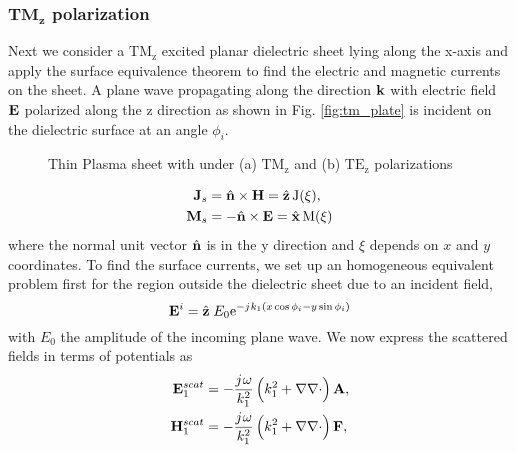 \subsubsection{$\mathbf{TM_z}$ polarization}
%
Next we consider a $\mathrm{TM_z}$ excited planar dielectric sheet lying along the x-axis and apply the surface equivalence theorem to find the electric and magnetic currents on the sheet. A plane wave propagating along the direction $\mathbf{k}$ with electric field $\mathbf{E}$ polarized along the z direction as shown in Fig. \ref{fig:tm_plate} is incident on the dielectric surface at an angle $\phi_i$.
%
\begin{figure}[b!]
  \centering
   \hfil
  \caption{Thin Plasma sheet with under (a) $\mathrm{TM_z}$ and (b) $\mathrm{TE_z}$ polarizations}
  \label{fig:thinsheets}
\end{figure}
%
\begin{subequations}
  \begin{align}
    \mathbf{J}_s &=  \hat{\mathbf{n}} \times \mathbf{H} = \hat {\mathbf{z}} \, \mathrm{J(\xi)},
    \label{eq:J_s}\\
    \mathbf{M}_s &=  -\hat{\mathbf{n}} \times \mathbf{E} = \hat {\mathbf{x}} \, \mathrm{M(\xi)}
    \label{eq:M_s}
  \end{align}
  \label{eq:eq_currents}%
\end{subequations}%
%
where the normal unit vector $\hat{\mathbf{n}}$ is in the y direction and $\xi$ depends on $x$ and $y$ coordinates. To find the surface currents, we set up an homogeneous equivalent problem first for the region outside the dielectric sheet due to an incident field,
%
\begin{equation}
  \mathbf{E}^i = \hat{\mathbf{z}} \; E_0  \mathrm{e}^{-{j}\mkern1mu k_1 (x \cos \phi_i - y \sin \phi_i)}
  \label{eq:E_i}
\end{equation}
%
with $E_0$ the amplitude of the incoming plane wave. We now express the scattered fields in terms of potentials as
%
\begin{subequations}
  \begin{align}
    \mathbf{E}_1^{scat} &=  -\frac{{j}\mkern1mu \omega}{k_1^2}\left( k_1^2 + \nabla \nabla \cdot \right) \mathbf{A},
    \label{eq:E1scat}\\
    \mathbf{H}_1^{scat} &=  -\frac{{j}\mkern1mu \omega}{k_1^2}\left( k_1^2 + \nabla \nabla \cdot \right) \mathbf{F},
    \label{eq:H1scat}
  \end{align}
  \label{eq:1scat_pot}%
\end{subequations}%
